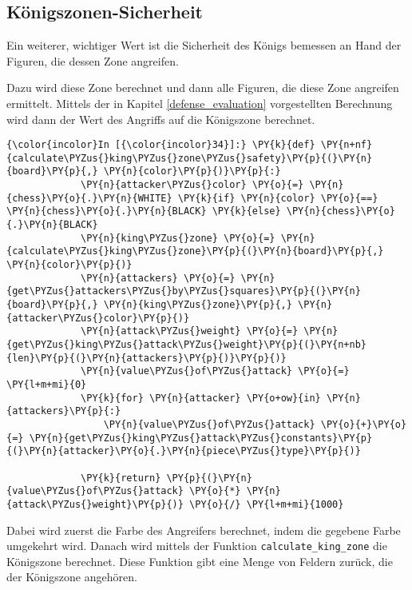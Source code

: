     \subsection{Königszonen-Sicherheit}\label{kuxf6nigszonen-sicherheit}

Ein weiterer, wichtiger Wert ist die Sicherheit des Königs bemessen an
Hand der Figuren, die dessen Zone angreifen.

Dazu wird diese Zone berechnet und dann alle Figuren, die diese Zone
angreifen ermittelt. Mittels der in Kapitel \ref{defense_evaluation} vorgestellten
Berechnung wird dann der Wert des Angriffs auf die Königszone berechnet.

    \begin{Verbatim}[commandchars=\\\{\}]
{\color{incolor}In [{\color{incolor}34}]:} \PY{k}{def} \PY{n+nf}{calculate\PYZus{}king\PYZus{}zone\PYZus{}safety}\PY{p}{(}\PY{n}{board}\PY{p}{,} \PY{n}{color}\PY{p}{)}\PY{p}{:}
             \PY{n}{attacker\PYZus{}color} \PY{o}{=} \PY{n}{chess}\PY{o}{.}\PY{n}{WHITE} \PY{k}{if} \PY{n}{color} \PY{o}{==} \PY{n}{chess}\PY{o}{.}\PY{n}{BLACK} \PY{k}{else} \PY{n}{chess}\PY{o}{.}\PY{n}{BLACK}
             \PY{n}{king\PYZus{}zone} \PY{o}{=} \PY{n}{calculate\PYZus{}king\PYZus{}zone}\PY{p}{(}\PY{n}{board}\PY{p}{,} \PY{n}{color}\PY{p}{)}
             \PY{n}{attackers} \PY{o}{=} \PY{n}{get\PYZus{}attackers\PYZus{}by\PYZus{}squares}\PY{p}{(}\PY{n}{board}\PY{p}{,} \PY{n}{king\PYZus{}zone}\PY{p}{,} \PY{n}{attacker\PYZus{}color}\PY{p}{)}
             \PY{n}{attack\PYZus{}weight} \PY{o}{=} \PY{n}{get\PYZus{}king\PYZus{}attack\PYZus{}weight}\PY{p}{(}\PY{n+nb}{len}\PY{p}{(}\PY{n}{attackers}\PY{p}{)}\PY{p}{)}
             \PY{n}{value\PYZus{}of\PYZus{}attack} \PY{o}{=} \PY{l+m+mi}{0}
             \PY{k}{for} \PY{n}{attacker} \PY{o+ow}{in} \PY{n}{attackers}\PY{p}{:}
                 \PY{n}{value\PYZus{}of\PYZus{}attack} \PY{o}{+}\PY{o}{=} \PY{n}{get\PYZus{}king\PYZus{}attack\PYZus{}constants}\PY{p}{(}\PY{n}{attacker}\PY{o}{.}\PY{n}{piece\PYZus{}type}\PY{p}{)}
             
             \PY{k}{return} \PY{p}{(}\PY{n}{value\PYZus{}of\PYZus{}attack} \PY{o}{*} \PY{n}{attack\PYZus{}weight}\PY{p}{)} \PY{o}{/} \PY{l+m+mi}{1000}
\end{Verbatim}

    Dabei wird zuerst die Farbe des Angreifers berechnet, indem die gegebene
Farbe umgekehrt wird. Danach wird mittels der Funktion
\texttt{calculate\_king\_zone} die Königszone berechnet. Diese Funktion
gibt eine Menge von Feldern zurück, die der Königszone angehören.


